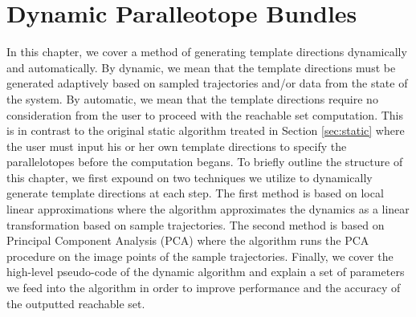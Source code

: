 \chapter{Dynamic Paralleotope Bundles}

In this chapter, we cover a method of generating template directions dynamically and automatically.
%
By dynamic, we mean that the template directions must be generated adaptively based on sampled trajectories and/or data from the state of the system.
%
By automatic, we mean that the template directions require no consideration from the user to proceed with the reachable set computation. This is in contrast to the original static algorithm treated in Section \ref{sec:static} where the user must input his or her own template directions to specify the parallelotopes before the computation begans.
%
To briefly outline the structure of this chapter, we first expound on two techniques we utilize to dynamically generate template directions at each step.
%
The first method is based on local linear approximations where the algorithm approximates the dynamics as a linear transformation based on sample trajectories.
%
The second method is based on Principal Component Analysis (PCA) where the algorithm runs the PCA procedure on the image points of the sample trajectories.
%
Finally, we cover the high-level pseudo-code of the dynamic algorithm and explain a set of parameters we feed into the algorithm in order to improve performance and the accuracy of the outputted reachable set.



